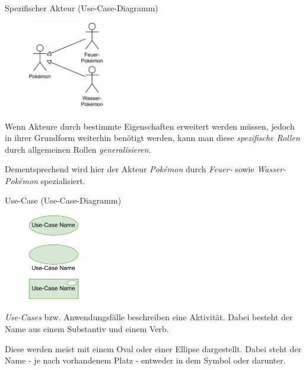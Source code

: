 \begin{bonus}{Spezifischer Akteur (Use-Case-Diagramm)}
    \begin{figure}
        \centering
        \includegraphics[width=0.3\textwidth]{includes/figures/bonus_diagrams_use_case_akteur_specification.pdf}
    \end{figure}
    Wenn Akteure durch bestimmte Eigenschaften erweitert werden müssen, jedoch in ihrer Grundform weiterhin benötigt werden, kann man diese \emph{spezifische Rollen} durch allgemeinen Rollen \emph{generalisieren}.

    Dementsprechend wird hier der Akteur \emph{Pokémon} durch \emph{Feuer-} sowie \emph{Wasser-Pokémon} spezialisiert.

    \vspace{7em}
\end{bonus}

\begin{diag}{Use-Case (Use-Case-Diagramm)}
    \begin{figure}
        \centering
        \includegraphics[width=0.2\textwidth]{includes/figures/defi_diagrams_use_case.pdf}
    \end{figure}
    \emph{Use-Cases} bzw. Anwendungsfälle beschreiben eine Aktivität.
    Dabei besteht der Name aus einem Substantiv und einem Verb.

    Diese werden meist mit einem Oval oder einer Ellipse dargestellt.
    Dabei steht der Name - je nach vorhandenem Platz - entweder in dem Symbol oder darunter.

    \vspace{8em}
\end{diag}

